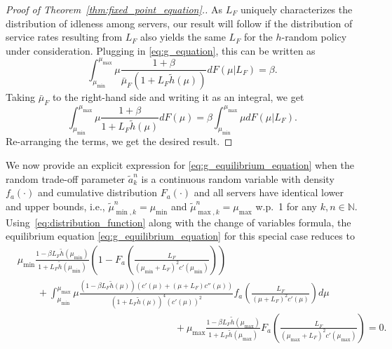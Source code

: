 \documentclass[a4paper,11pt,twoside]{article}
\numberwithin{equation}{section}
\numberwithin{figure}{section}
\theoremstyle{plain}
\newcommand{\NN}{\mathbb{N}}
\newcommand{\1}{\mathbbm{1}}
\begin{document}
\begin{proof}[Proof of Theorem~\ref{thm:fixed_point_equation}.]
As $L_F$ uniquely characterizes the distribution of idleness among servers, our result will follow if the distribution of service rates resulting from $L_F$ also yields the same $L_F$ for the $h$-random policy under consideration. Plugging in \eqref{eq:g_equation}, this can be written as
\[
\int_{\mu_{\min}}^{\mu_{\max}}\mu\frac{1+\beta}{\bar{\mu}_F(1+L_F\tilde{h}(\mu))}dF(\mu|L_F)=\beta.
\]
Taking $\bar{\mu}_F$ to the right-hand side and writing it as an integral, we get
\[
\int_{\mu_{\min}}^{\mu_{\max}}\mu\frac{1+\beta}{1+L_F\tilde{h}(\mu)}dF(\mu)=\beta\int_{\mu_{\min}}^{\mu_{\max}}\mu dF(\mu|L_F).
\]
Re-arranging the terms, we get the desired result.
\end{proof}

We now provide an explicit expression for \eqref{eq:g_equilibrium_equation} when the random trade-off parameter $\tilde{a}_k^n$ is a continuous random variable with density $f_a(\cdot)$ and cumulative distribution $F_a(\cdot)$ and  all servers have identical lower and upper bounds, i.e., $\tilde{\mu}_{\min,k}^n = \mu_{\min}$ and $\tilde{\mu}_{\max,k}^n = \mu_{\max}$ w.p.~1 for any $k,n\in\NN$. 
Using~\eqref{eq:distribution_function} along with the change of variables formula, the equilibrium equation \eqref{eq:g_equilibrium_equation} for this special case reduces to 
\begin{align*}
&\mu_{\min}\frac{1-\beta L_F\tilde{h}(\mu_{\min})}{1+L_F\tilde{h}(\mu_{\min})}\left(1-F_a\left(\frac{L_F}{(\mu_{\min} +L_F)^2c'(\mu_{\min})}\right)\right)\\&\qquad + 
\int_{\mu_{\min}}^{\mu_{\max}}\mu\frac{(1-\beta L_F\tilde{h}(\mu))(c'(\mu)+(\mu+ L_F)c''(\mu))}{(1+L_F\tilde{h}(\mu))^4(c'(\mu))^2}f_a\left(\frac{L_F}{(\mu +L_F)^2c'(\mu)}\right)d\mu\\
&\qquad\qquad\qquad\qquad\qquad\qquad\qquad\qquad + \mu_{\max}\frac{1-\beta L_F\tilde{h}(\mu_{\max})}{1+L_F\tilde{h}(\mu_{\max})}F_a\left(\frac{L_F}{(\mu_{\max} +L_F)^2c'(\mu_{\max})}\right) = 0.
\end{align*}
\end{document}
